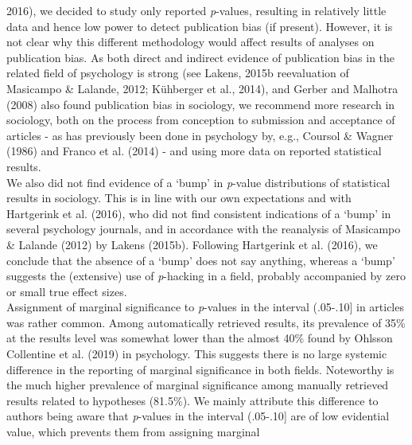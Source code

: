\documentclass[
  12pt,
]{article}
\begin{document}
2016), we decided to study only reported \emph{p}-values, resulting in
relatively little data and hence low power to detect publication bias
(if present). However, it is not clear why this different methodology
would affect results of analyses on publication bias. As both direct and
indirect evidence of publication bias in the related field of psychology
is strong (see Lakens, 2015b reevaluation of Masicampo \& Lalande, 2012;
Kühberger et al., 2014), and Gerber and Malhotra (2008) also found
publication bias in sociology, we recommend more research in sociology,
both on the process from conception to submission and acceptance of
articles - as has previously been done in psychology by, e.g., Coursol
\& Wagner (1986) and Franco et al. (2014) - and using more data on
reported statistical results.~\\
\hspace*{0.333em}\hspace*{0.333em}\hspace*{0.333em}\hspace*{0.333em}We
also did not find evidence of a `bump' in \emph{p}-value distributions
of statistical results in sociology. This is in line with our own
expectations and with Hartgerink et al. (2016), who did not find
consistent indications of a `bump' in several psychology journals, and
in accordance with the reanalysis of Masicampo \& Lalande (2012) by
Lakens (2015b). Following Hartgerink et al. (2016), we conclude that the
absence of a `bump' does not say anything, whereas a `bump' suggests the
(extensive) use of \emph{p}-hacking in a field, probably accompanied by
zero or small true effect sizes.~\\
\hspace*{0.333em}\hspace*{0.333em}\hspace*{0.333em}\hspace*{0.333em}Assignment
of marginal significance to \emph{p}-values in the interval (.05-.10{]}
in articles was rather common. Among automatically retrieved results,
its prevalence of 35\% at the results level was somewhat lower than the
almost 40\% found by Ohlsson Collentine et al. (2019) in psychology.
This suggests there is no large systemic difference in the reporting of
marginal significance in both fields. Noteworthy is the much higher
prevalence of marginal significance among manually retrieved results
related to hypotheses (81.5\%). We mainly attribute this difference to
authors being aware that \emph{p}-values in the interval (.05-.10{]} are
of low evidential value, which prevents them from assigning marginal
\end{document}
